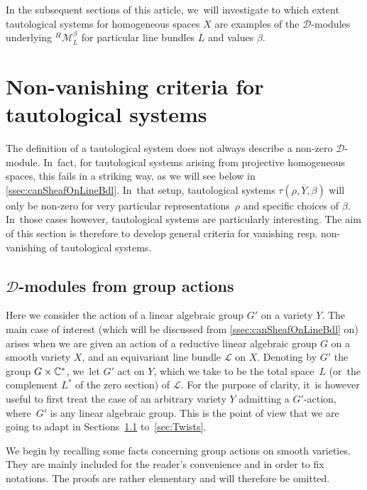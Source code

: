 \documentclass[11pt]{article}
\newcommand{\resp}{resp.\xspace}
\begin{document}
In the subsequent sections of this article, we~will investigate to which extent tautological systems for homogeneous spaces $X$ are examples of the $\mathscr D$\nobreakdash-mod\-ules underlying ${}^{H\!}\mathcal M_L^\beta$ for particular line bundles $L$ and values $\beta$.

\section{Non-vanishing criteria for tautological systems} \label{sec:nonVanishingCriteria}

The definition of a tautological system does not always describe a non-zero $\mathscr D$\nobreakdash-mod\-ule. In~fact, for tautological systems arising from projective homogeneous spaces, this fails in a striking way, as we will see below in \cref{ssec:canSheafOnLineBdl}. In~that setup, tautological systems $\tau(\rho,\overline{Y},\beta)$ will only be non-zero for very particular representations~$\rho$ and specific choices of $\beta$. In~those cases however, tautological systems are particularly interesting.
The aim of this section is therefore to develop general criteria for vanishing \resp non-vanishing of tautological systems.

\subsection{\texorpdfstring{$\mathscr D$}{D}-modules from group actions} \label{ssec:VFfromGroupActions}

Here we consider the action of a linear algebraic group $G'$ on a variety $Y$.
The main case of interest (which will be discussed from \cref{ssec:canSheafOnLineBdl} on)
arises when we are given an action of a reductive linear algebraic group $G$ on a smooth variety $X$, and an equivariant line bundle $\mathscr{L}$ on $X$. Denoting by $G'$ the group $G \times {\mathbb C}^*$, we~let $G'$ act on $Y$, which we take to be the total space~$L$ (or~the complement $L^*$ of the zero section) of $\mathscr{L}$. For the purpose of clarity, it~is however useful to first treat the case of an arbitrary variety $Y$ admitting a $G'$-action, where~$G'$ is any linear algebraic group. This is the point of view that we are going to adapt in Sections~\ref{ssec:VFfromGroupActions} to~\ref{sec:Twists}.

We begin by recalling some facts concerning group actions on smooth varieties. They are mainly included for the reader's convenience and in order to fix notations. The proofs are rather elementary and will therefore be omitted.
\end{document}
